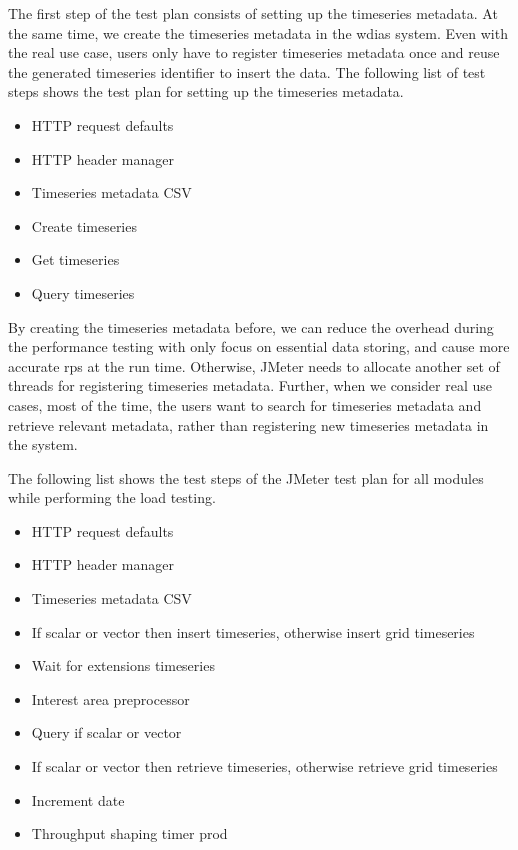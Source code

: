 The first step of the test plan consists of setting up the timeseries metadata. At the same time, we create the timeseries metadata in the \acrshort{wdias} system. Even with the real use case, users only have to register timeseries metadata once and reuse the generated timeseries identifier to insert the data. The following list of test steps shows the test plan for setting up the timeseries metadata.

\begin{itemize}
    \item HTTP request defaults
    \item HTTP header manager
    \item Timeseries metadata CSV
    \item Create timeseries
    \item Get timeseries
    \item Query timeseries
\end{itemize}

By creating the timeseries metadata before, we can reduce the overhead during the performance testing with only focus on essential data storing, and cause more accurate \acrshort{rps} at the run time. Otherwise, JMeter needs to allocate another set of threads for registering timeseries metadata. Further, when we consider real use cases, most of the time, the users want to search for timeseries metadata and retrieve relevant metadata, rather than registering new timeseries metadata in the system.

The following list shows the test steps of the JMeter test plan for all modules while performing the load testing.

\begin{itemize}
    \item HTTP request defaults
    \item HTTP header manager
    \item Timeseries metadata CSV
    \item If scalar or vector then insert timeseries, otherwise insert grid timeseries
    \item Wait for extensions timeseries
    \item Interest area preprocessor
    \item Query if scalar or vector
    \item If scalar or vector then retrieve timeseries, otherwise retrieve grid timeseries
    \item Increment date
    \item Throughput shaping timer prod
\end{itemize}

